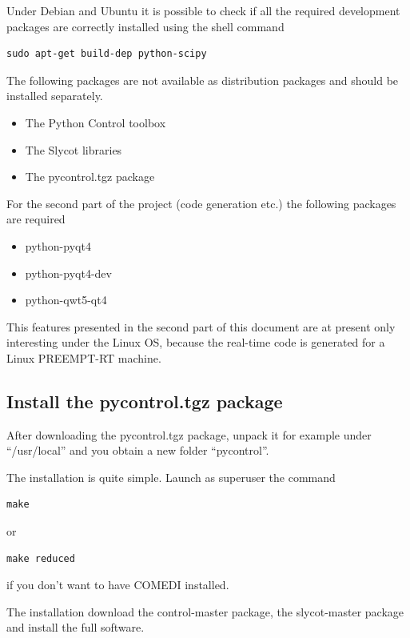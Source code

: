 Under Debian and Ubuntu it is possible to check if all the required development 
packages are correctly installed using the shell command

\begin{verbatim}
sudo apt-get build-dep python-scipy
\end{verbatim}

The following packages are not available as distribution packages and should be 
installed separately.

\begin{itemize}
\item The Python Control toolbox \cite{PYCONTROL}
\item The Slycot libraries \cite{SLYCOT}
\item The pycontrol.tgz package \cite{SUPSICTRL}
\end{itemize}

For the second part of the project (code generation etc.) the following 
packages 
are required

\begin{itemize}
\item python-pyqt4
\item python-pyqt4-dev
\item python-qwt5-qt4
\end{itemize}

This features presented in the second part of this document are at present only 
interesting under the Linux OS, because the real-time code is generated for a 
Linux PREEMPT-RT machine.

\subsection{Install the pycontrol.tgz package}
After downloading the pycontrol.tgz package, unpack it for example under 
``/usr/local'' and you obtain a new folder ``pycontrol''.

The installation is quite simple. Launch as superuser the command

\begin{verbatim}
make
\end{verbatim}

or

\begin{verbatim}
make reduced
\end{verbatim}

if you don't want to have COMEDI installed.

The installation download the control-master package, the slycot-master package 
and install the full software.

